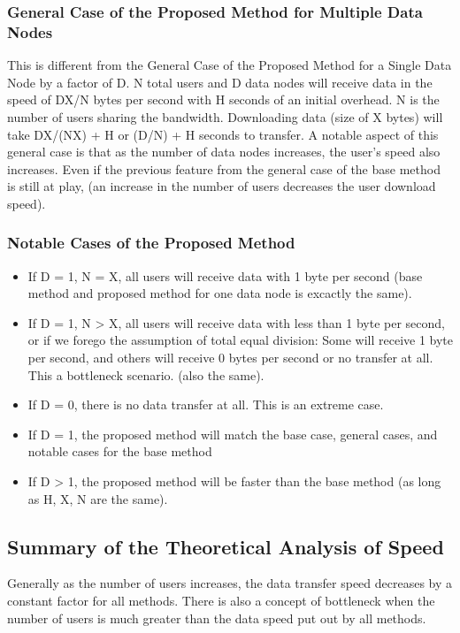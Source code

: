 \documentclass[acmsmall]{acmart}
\begin{document}
\subsubsection{General Case of the Proposed Method for Multiple Data Nodes} 
This is different from the General Case of the Proposed Method for a Single Data Node by a factor of D. N total users and D data nodes will receive data in the speed of DX/N bytes per second with H seconds of an initial overhead. N is the number of users sharing the bandwidth. Downloading data (size of X bytes)  will take DX/(NX) + H or (D/N) + H seconds to transfer. A notable aspect of this general case is that as the number of data nodes increases, the user's speed also increases. Even if the previous feature from the general case of the base method is still at play, (an increase in the number of users decreases the user download speed).

\subsubsection{Notable Cases of the Proposed Method}
\begin{itemize}
    \item  If D = 1, N = X, all users will receive data with 1 byte per second (base method and proposed method for one data node is excactly the same).
    \item If D = 1, N > X, all users will receive data with less than 1 byte per second, or if we forego the assumption of total equal division: Some will receive 1 byte per second, and others will receive 0 bytes per second or no transfer at all. This a bottleneck scenario. (also the same).
    \item If D = 0, there is no data transfer at all. This is an extreme case.
    \item If D = 1, the proposed method will match the base case, general cases, and notable cases for the base method
    \item If D > 1, the proposed method will be faster than the base method (as long as H, X, N are the same).
\end{itemize}

\subsection{Summary of the Theoretical Analysis of Speed} \label{theoreticalspeed}
Generally as the number of users increases, the data transfer speed decreases by a constant factor for all methods. There is also a concept of bottleneck when the number of users is much greater than the data speed put out by all methods.
\end{document}
